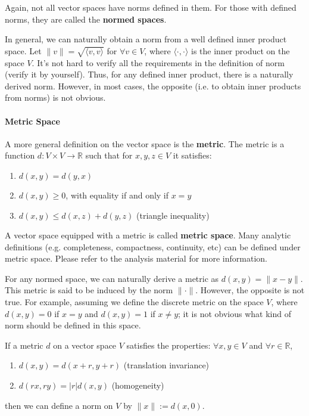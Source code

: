 \documentclass[12pt,oneside]{article}
\begin{document}
Again, not all vector spaces have norms defined in them.  For those with defined norms, they are called the \textbf{normed spaces}.

In general, we can naturally obtain a norm from a well defined inner product space. Let $\|v\|=\sqrt{\langle v,v \rangle}$ for $\forall v\in V$, where $\langle \cdot,\cdot \rangle$ is the inner product on the space $V$. It's not hard to verify all the requirements in the definition of norm (verify it by yourself). Thus, for any defined inner product, there is a naturally derived norm. However, in most cases, the opposite (i.e. to obtain inner products from norms) is not obvious.

\paragraph{Metric Space}
A more general definition on the vector space is the \textbf{metric}. 
The metric is a function $d: V \times V\rightarrow \mathbb{R}$ such that for $x,y,z \in V$ it satisfies:
\begin{enumerate}
\item $d(x,y) = d(y,x)$
\item $d(x,y) \geq 0$, with equality if and only if $x=y$
\item $d(x,y)\leq d(x,z)+d(y,z)$ (triangle inequality)
\end{enumerate}
A vector space equipped with a metric is called \textbf{metric space}. Many analytic definitions (e.g. completeness, compactness, continuity, etc) can be defined under metric space.
Please refer to the analysis material for more information.

For any normed space, we can naturally derive a metric as $d(x,y)=\|x-y\|$. This metric is said to be induced by the norm $\|\cdot\|$. However, the opposite is not true. For example, assuming we define the discrete metric on the space $V$, where $d(x,y)=0$ if $x=y$ and $d(x,y)=1$ if $x\neq y$; it is not obvious what kind of norm should be defined in this space.

If a metric $d$ on a vector space $V$ satisfies the properties:
$\forall x, y\in V$ and $\forall r \in \mathbb{R}$,
\begin{enumerate}
\item $d(x,y) = d(x + r, y+r)$ (translation invariance)
\item $d(rx, ry) = |r| d(x, y)$ (homogeneity)
\end{enumerate}
then we can define a norm on $V$ by $\|x\| := d(x,0)$.\\
\end{document}

